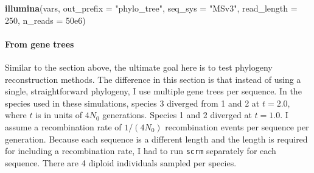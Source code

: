 \documentclass[12pt,]{article}
\newenvironment{Shaded}{\begin{snugshade}}{\end{snugshade}}
\newcommand{\CommentTok}[1]{\textcolor[rgb]{0.56,0.35,0.01}{\textit{#1}}}
\newcommand{\ControlFlowTok}[1]{\textcolor[rgb]{0.13,0.29,0.53}{\textbf{#1}}}
\newcommand{\DataTypeTok}[1]{\textcolor[rgb]{0.13,0.29,0.53}{#1}}
\newcommand{\DecValTok}[1]{\textcolor[rgb]{0.00,0.00,0.81}{#1}}
\newcommand{\FloatTok}[1]{\textcolor[rgb]{0.00,0.00,0.81}{#1}}
\newcommand{\KeywordTok}[1]{\textcolor[rgb]{0.13,0.29,0.53}{\textbf{#1}}}
\newcommand{\NormalTok}[1]{#1}
\newcommand{\OperatorTok}[1]{\textcolor[rgb]{0.81,0.36,0.00}{\textbf{#1}}}
\newcommand{\StringTok}[1]{\textcolor[rgb]{0.31,0.60,0.02}{#1}}
\let\oldparagraph\paragraph
\renewcommand{\paragraph}[1]{\oldparagraph{#1}\mbox{}}
\begin{document}
\begin{Shaded}
\begin{Highlighting}[]
\KeywordTok{illumina}\NormalTok{(vars, }\DataTypeTok{out_prefix =} \StringTok{"phylo_tree"}\NormalTok{,}
         \DataTypeTok{seq_sys =} \StringTok{"MSv3"}\NormalTok{,}
         \DataTypeTok{read_length =} \DecValTok{250}\NormalTok{,}
         \DataTypeTok{n_reads =} \FloatTok{50e6}\NormalTok{)}
\end{Highlighting}
\end{Shaded}

\hypertarget{from-gene-trees}{%
\paragraph{From gene trees}\label{from-gene-trees}}

Similar to the section above, the ultimate goal here is to test phylogeny
reconstruction methods.
The difference in this section is that instead of using a single, straightforward
phylogeny, I use multiple gene trees per sequence.
In the species used in these simulations, species 3 diverged from 1 and 2 at \(t = 2.0\),
where \(t\) is in units of \(4 N_0\) generations.
Species 1 and 2 diverged at \(t = 1.0\).
I assume a recombination rate of \(1 / (4 N_0)\) recombination events per sequence
per generation.
Because each sequence is a different length and the length is required for including
a recombination rate, I had to run \texttt{scrm} separately for each sequence.
There are 4 diploid individuals sampled per species.

\begin{Shaded}
\end{Shaded}
\end{document}
